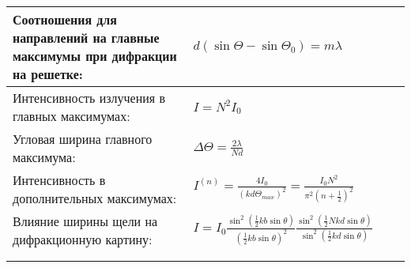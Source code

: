 \documentclass{article}
\begin{document}
\begin{tabular}{ |p{4.2cm}|p{5.3cm}|p{6cm}|p{3.5cm}|  }
                                                                             \\ %
\hline
Соотношения для направлений на главные максимумы при дифракции на решетке:   &  %
$d(\sin{\Theta}-\sin{\Theta_0}) = m \lambda$                                 &  %
                                                                             &  %
                                                                             \\ %
\hline
Интенсивность излучения в главных максимумах:                                &  %
$I = N^2 I_0$                                                                &  %
                                                                             &  %
                                                                             \\ %
\hline
Угловая ширина главного максимума:                                           &  %
$\Delta \Theta = \frac{2 \lambda}{Nd}$                                                   &  %
                                                                             &  %
                                                                             \\ %
\hline
Интенсивность в дополнительных максимумах:                                   &  %
$I^{(n)} = \frac{4 I_0}{(kd\Theta_{max})^2} =
 \frac{I_0 N^2}{\pi^2 (n + \frac{1}{2})^2}$                                  &  %
                                                                             &  %
                                                                             \\ %
\hline
Влияние ширины щели на дифракционную картину:                                &  %
$I=I_{0} \frac{\sin ^{2}\left(\frac{1}{2} k b \sin \theta\right)}
              {\left(\frac{1}{2} k b \sin \theta\right)^{2}}
         \frac{\sin ^{2}\left(\frac{1}{2} N k d \sin \theta\right)}
              {\sin ^{2}\left(\frac{1}{2} k d \sin \theta\right)}$           &  %
                                                                             &  %
                                                                             \\ %
\hline
                                                                             &  %
                                                                             &  %
                                                                             &  %
                                                                             \\ %
\hline
                                                                             &  %
                                                                             &  %
                                                                             &  %
                                                                             \\ %
\hline
\end{tabular}
\end{document}
